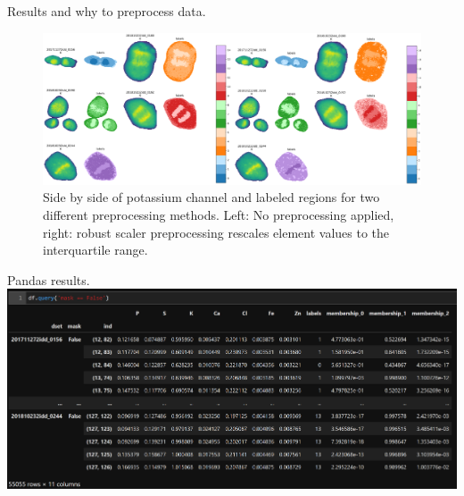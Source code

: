\documentclass[
]{beamer}
\begin{document}
\begin{frame}{Results and why to preprocess data.}
\begin{figure}[h]
  \includegraphics[width=1\textwidth,height=.7\textheight,keepaspectratio]{labels_compare_preprocessing.png}
  \caption{Side by side of potassium channel and labeled regions for two different preprocessing methods. Left: No preprocessing applied, right: robust scaler preprocessing rescales element values to the interquartile range.}
\end{figure}
\end{frame}

\begin{frame}{Pandas results.}
    \includegraphics[width=1\textwidth,height=.7\textheight,keepaspectratio]{dataframe_labeled.PNG}
    \caption{Dataframe with labels and membership.}
\end{frame}
\end{document}

